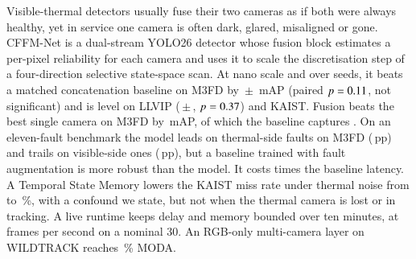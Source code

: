 Visible-thermal detectors usually fuse their two cameras as if both were always healthy, yet in service one camera is often dark, glared, misaligned or gone. CFFM-Net is a dual-stream YOLO26 detector whose fusion block estimates a per-pixel reliability for each camera and uses it to scale the discretisation step of a four-direction selective state-space scan. At nano scale and over \resLlvipCffmVtwoSeedCount{} seeds, it beats a matched concatenation baseline on M3FD by \marMfdVtwoVsConcatMdMeanMap{}\,$\pm$\,\marMfdVtwoVsConcatMdStdMap{} mAP (paired $p=0.11{}$, not significant) and is level on LLVIP (\marLlvipVtwoVsConcatMdMeanMap{}\,$\pm$\,\marLlvipVtwoVsConcatMdStdMap{}, $p=0.37{}$) and KAIST. Fusion beats the best single camera on M3FD by \gainMfdCffmVtwoOverBestMeanMap{}\,mAP, of which the baseline captures \gainMfdConcatMdOverBestMeanMap{}. On an eleven-fault benchmark the model leads on thermal-side faults on M3FD (\fltMfdMarginMeanThermalAvgSevThreeMap{}\,pp) and trails on visible-side ones (\fltMfdMarginMeanVisibleAvgSevThreeMap{}\,pp), but a baseline trained with fault augmentation is more robust than the model. It costs \latLocalRatioMedian{} times the baseline latency. A Temporal State Memory lowers the KAIST miss rate under thermal noise from \memThermalNoiseImageAllMr{} to \memThermalNoiseMemoryAllMr{}\,\%, with a confound we state, but not when the thermal camera is lost or in tracking. A live runtime keeps delay and memory bounded over ten minutes, at \livSoakThirtyFps{} frames per second on a nominal 30. An RGB-only multi-camera layer on WILDTRACK reaches \camDetFineTunedModa\,\% MODA.
